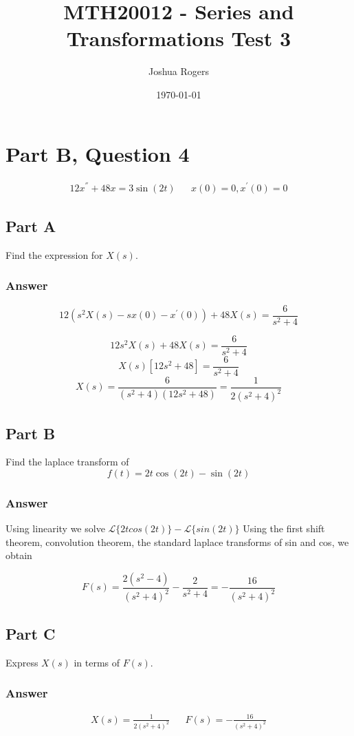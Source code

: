 \documentclass{article}
\title{\vspace{-4cm}MTH20012 - Series and Transformations Test 3}
\author{Joshua Rogers}
\date\today
\begin{document}
\maketitle 

\section*{Part B, Question 4}
\begin{align*}
12x^{''}+48x=3\sin(2t) && x(0)=0, x^{'}(0)=0
\end{align*}

\subsection*{Part A}
Find the expression for $X(s)$.
\subsubsection*{Answer}

$$12 \left(s^2X(s)-sx(0)-x^{'}(0)\right) + 48 X(s)=\frac{6}{s^2+4}$$

$$12s^2X(s)+48X(s)=\frac{6}{s^2+4}$$
$$X(s) \left[ 12s^2 + 48 \right] = \frac{6}{s^2+4}$$
$$X(s) = \frac{6}{(s^2+4)(12s^2+48)} = \frac{1}{2\left(s^2+4\right)^2}$$

\subsection*{Part B}
Find the laplace transform of
$$f(t) = 2t \cos(2t) - \sin(2t)$$
\subsubsection*{Answer}
Using linearity we solve $\mathcal{L}\{2t cos(2t)\} - \mathcal{L}\{sin(2t)\}$
Using the first shift theorem, convolution theorem, the standard laplace transforms of sin and cos, we obtain

$$F(s) = \frac{2(s^2-4)}{(s^2+4)^2} - \frac{2}{s^2+4} = -\frac{16}{(s^2+4)^2}$$

\pagebreak
\subsection*{Part C}
Express $X(s)$ in terms of $F(s)$.
\subsubsection*{Answer}

\begin{align*}
X(s) = \frac{1}{2\left(s^2+4\right)^2} && F(s) = -\frac{16}{(s^2+4)^2}
\end{align*}
\end{document}

